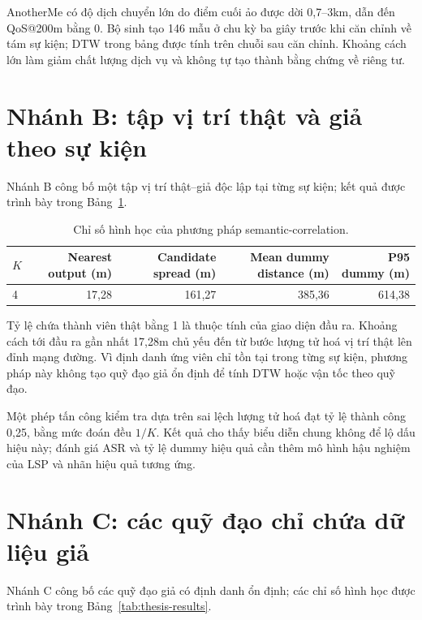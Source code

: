 \documentclass[12pt,a4paper,oneside]{report}
\begin{document}
AnotherMe có độ dịch chuyển lớn do điểm cuối ảo được dời 0,7--3km, dẫn đến QoS@200m bằng 0. Bộ sinh tạo 146 mẫu ở chu kỳ ba giây trước khi căn chỉnh về tám sự kiện; DTW trong bảng được tính trên chuỗi sau căn chỉnh. Khoảng cách lớn làm giảm chất lượng dịch vụ và không tự tạo thành bằng chứng về riêng tư.

\section{Nhánh B: tập vị trí thật và giả theo sự kiện}

Nhánh B công bố một tập vị trí thật--giả độc lập tại từng sự kiện; kết quả được trình bày trong Bảng~\ref{tab:semantic-results}.

\begin{table}[htbp]
\centering
\small
\caption{Chỉ số hình học của phương pháp semantic-correlation.}
\label{tab:semantic-results}
\begin{tabular}{lrrrr}
\toprule
$K$ & Nearest output (m) & Candidate spread (m) & Mean dummy distance (m) & P95 dummy (m) \\
\midrule
4 & 17,28 & 161,27 & 385,36 & 614,38 \\
\bottomrule
\end{tabular}
\end{table}

Tỷ lệ chứa thành viên thật bằng 1 là thuộc tính của giao diện đầu ra. Khoảng cách tới đầu ra gần nhất 17,28m chủ yếu đến từ bước lượng tử hoá vị trí thật lên đỉnh mạng đường. Vì định danh ứng viên chỉ tồn tại trong từng sự kiện, phương pháp này không tạo quỹ đạo giả ổn định để tính DTW hoặc vận tốc theo quỹ đạo.

Một phép tấn công kiểm tra dựa trên sai lệch lượng tử hoá đạt tỷ lệ thành công 0,25, bằng mức đoán đều $1/K$. Kết quả cho thấy biểu diễn chung không để lộ dấu hiệu này; đánh giá ASR và tỷ lệ dummy hiệu quả cần thêm mô hình hậu nghiệm của LSP và nhãn hiệu quả tương ứng.

\section{Nhánh C: các quỹ đạo chỉ chứa dữ liệu giả}

Nhánh C công bố các quỹ đạo giả có định danh ổn định; các chỉ số hình học được trình bày trong Bảng~\ref{tab:thesis-results}.
\end{document}
